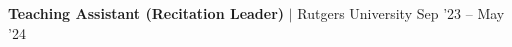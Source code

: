 \resumeProjectHeading
{\textbf{Teaching Assistant (Recitation Leader)} $|$ Rutgers University}
{Sep '23 -- May '24}{}
\vspace{-20pt}

